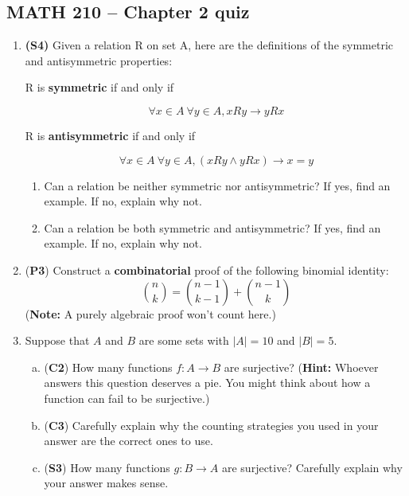 \documentclass[12pt]{article}
\begin{document}
\pagestyle{empty}
\begin{center}
\section*{MATH 210 -- Chapter 2 quiz}
\end{center}

\begin{enumerate}




\item
\textbf{(S4)} Given a relation R on set A, here are the definitions of the symmetric and antisymmetric properties:

R is \textbf{symmetric} if and only if

        \[\forall x \in A\ \forall y \in A, xRy \rightarrow yRx \]

R is \textbf{antisymmetric} if and only if 

		\[\forall x \in A\ \forall y \in A, (xRy \land yRx) \rightarrow x = y \]

\begin{enumerate}
    \item Can a relation be neither symmetric nor antisymmetric? If yes, find an example. If no, explain why not.
    \item Can a relation be both symmetric and antisymmetric? If yes, find an example. If no, explain why not.
\end{enumerate}	

\item (\textbf{P3}) Construct a \textbf{combinatorial} proof of the following binomial identity: 
\[\binom{n}{k} = \binom{n-1}{k-1} + \binom{n-1}{k}\]
(\textbf{Note:} A purely algebraic proof won't count here.)

\item Suppose that $A$ and $B$ are some sets with $|A| = 10$ and $|B| = 5$.
\begin{enumerate}[(a)]
    \item (\textbf{C2}) How many functions $f:A\to B$ are surjective? (\textbf{Hint:} Whoever answers this question deserves a pie. You might think about how a function can fail to be surjective.)
    \item (\textbf{C3}) Carefully explain why the counting strategies you used in your answer are the correct ones to use.
    
    \item (\textbf{S3}) How many functions $g:B \to A$ are surjective? Carefully explain why your answer makes sense.
    

\end{enumerate}
\end{enumerate}
\end{document}
